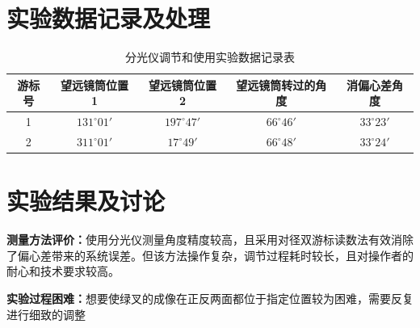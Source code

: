\documentclass[12pt,a4paper]{article}
\begin{document}
	\section{实验数据记录及处理}
	\begin{table}[htbp]
		\centering
		\caption{分光仪调节和使用实验数据记录表}
		\begin{tabular}{|c|c|c|c|c|}
			\hline
			游标号 & 望远镜筒位置 1 & 望远镜筒位置 2 & 望远镜筒转过的角度 & 消偏心差角度 \\
			\hline
			1 & $131^\circ 01'$ & $197^\circ 47'$ & $66^\circ 46'$ & $33^\circ 23'$ \\
			\hline
			2 & $311^\circ 01'$ & $17^\circ 49'$ & $66^\circ 48'$ & $33^\circ 24'$ \\
			\hline
		\end{tabular}
	\end{table}
	
	
	\section{实验结果及讨论}
	\textbf{测量方法评价：}使用分光仪测量角度精度较高，且采用对径双游标读数法有效消除了偏心差带来的系统误差。但该方法操作复杂，调节过程耗时较长，且对操作者的耐心和技术要求较高。\par
	\textbf{实验过程困难：}想要使绿叉的成像在正反两面都位于指定位置较为困难，需要反复进行细致的调整
\end{document}
